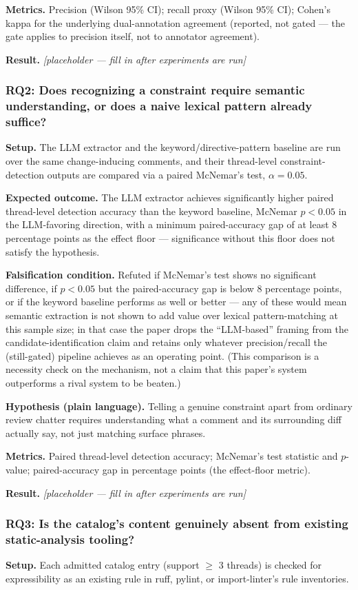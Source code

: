 \documentclass[11pt]{article}
\newcommand{\ph}{\textit{[placeholder --- fill in after experiments are run]}}
\begin{document}
\textbf{Metrics.} Precision (Wilson 95\% CI); recall proxy (Wilson 95\% CI); Cohen's kappa for the underlying dual-annotation agreement (reported, not gated --- the gate applies to precision itself, not to annotator agreement).

\textbf{Result.} \ph

\subsubsection{RQ2: Does recognizing a constraint require semantic understanding, or does a naive lexical pattern already suffice?}
\textbf{Setup.} The LLM extractor and the keyword/directive-pattern baseline are run over the same change-inducing comments, and their thread-level constraint-detection outputs are compared via a paired McNemar's test, $\alpha = 0.05$.

\textbf{Expected outcome.} The LLM extractor achieves significantly higher paired thread-level detection accuracy than the keyword baseline, McNemar $p < 0.05$ in the LLM-favoring direction, with a minimum paired-accuracy gap of at least 8 percentage points as the effect floor --- significance without this floor does not satisfy the hypothesis.

\textbf{Falsification condition.} Refuted if McNemar's test shows no significant difference, if $p < 0.05$ but the paired-accuracy gap is below 8 percentage points, or if the keyword baseline performs as well or better --- any of these would mean semantic extraction is not shown to add value over lexical pattern-matching at this sample size; in that case the paper drops the ``LLM-based'' framing from the candidate-identification claim and retains only whatever precision/recall the (still-gated) pipeline achieves as an operating point. (This comparison is a necessity check on the mechanism, not a claim that this paper's system outperforms a rival system to be beaten.)

\textbf{Hypothesis (plain language).} Telling a genuine constraint apart from ordinary review chatter requires understanding what a comment and its surrounding diff actually say, not just matching surface phrases.

\textbf{Metrics.} Paired thread-level detection accuracy; McNemar's test statistic and $p$-value; paired-accuracy gap in percentage points (the effect-floor metric).

\textbf{Result.} \ph

\subsubsection{RQ3: Is the catalog's content genuinely absent from existing static-analysis tooling?}
\textbf{Setup.} Each admitted catalog entry (support $\geq$ 3 threads) is checked for expressibility as an existing rule in ruff, pylint, or import-linter's rule inventories.
\end{document}
